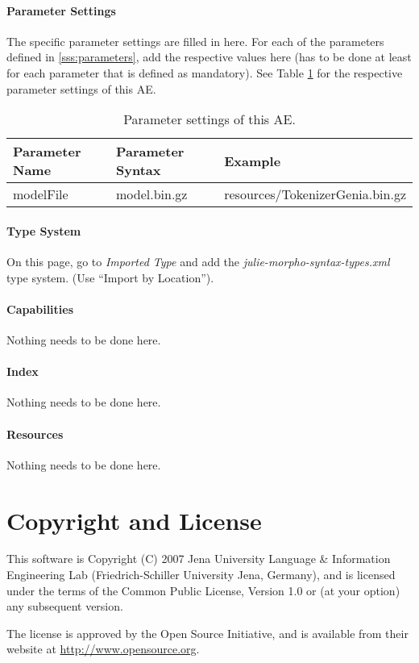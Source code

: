 \documentclass[11pt,a4paper,halfparskip]{scrartcl}
\begin{document}
\paragraph{Parameter Settings}
\label{sss:param_settings}

The specific parameter settings are filled in here. For each of the
parameters defined in \ref{sss:parameters}, add the respective values
here (has to be done at least for each parameter that is defined as
mandatory). See Table \ref{tab:param_settings} for the respective
parameter settings of this AE.

\begin{table}[h!]
  \centering
  \begin{tabular}{|p{4cm}|p{4cm}|p{7cm}|}
    \hline
    Parameter Name & Parameter Syntax & Example \\
    \hline\hline
    modelFile & model.bin.gz & resources/TokenizerGenia.bin.gz\\
  \hline
  \end{tabular}
  \caption{Parameter settings of this AE.}
  \label{tab:param_settings}
\end{table}

\paragraph{Type System}
\label{sss:type_system}
On this page, go to \emph{Imported Type} and add the \emph{julie-morpho-syntax-types.xml} type system. (Use ``Import by Location'').


\paragraph{Capabilities}
Nothing needs to be done here.


\paragraph{Index}
Nothing needs to be done here.

\paragraph{Resources}
Nothing needs to be done here.


\section{Copyright and License}
This software is Copyright (C) 2007 Jena University Language \& Information
Engineering Lab (Friedrich-Schiller University Jena, Germany), and is
licensed under the terms of the Common Public License, Version 1.0 or (at
your option) any subsequent version.

The license is approved by the Open Source Initiative, and is
available from their website at \url{http://www.opensource.org}.



\end{document}
